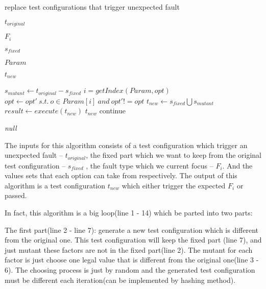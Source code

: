 \documentclass{sig-alternate}
\begin{document}
\begin{algorithm}
  \caption{replace test configurations that trigger unexpected fault}
  \begin{algorithmic}[1]
     \Require

     $t_{original}$ 

     $F_{i}$ 

     $s_{fixed}$ 

     $Param$ 


     \Ensure  $t_{new}$ 

       \State $s_{mutant} \leftarrow t_{original} - s_{fixed}$
          \State $i = getIndex(Param,opt) $
          \State $opt \leftarrow opt' \ s.t.\ o \in Param[i]\ and\ opt' != opt$
       \EndFor
       \State $t_{new} \leftarrow s_{fixed} \bigcup s_{mutant} $
       \State $result \leftarrow execute(t_{new})$
         \State \Return $t_{new}$
       \Else
         \State continue
       \EndIf
     \EndWhile

     \State \Return \emph{null}
  \end{algorithmic}
\end{algorithm}

The inputs for this algorithm consists of a test configuration which trigger an unexpected fault -- $t_{original}$, the fixed part which we want to keep from the original test configuration -- $s_{fixed}$ , the fault type which we current focus -- $F_{i}$. And the values sets that each option can take from respectively.  The output of this algorithm is a test configuration $t_{new}$ which either trigger the expected $F_{i}$ or passed.

In fact, this algorithm is a big loop(line 1 - 14) which be parted into two parts:

The first part(line 2 - line 7): generate a new test configuration which is different from the original one. This test configuration will keep the fixed part (line 7), and just mutant these factors are not in the fixed part(line 2). The mutant for each factor is just choose one legal value that is different from the original one(line 3 - 6). The choosing process is just by random and the generated test configuration must be different each iteration(can be implemented by hashing method).
\end{document}
